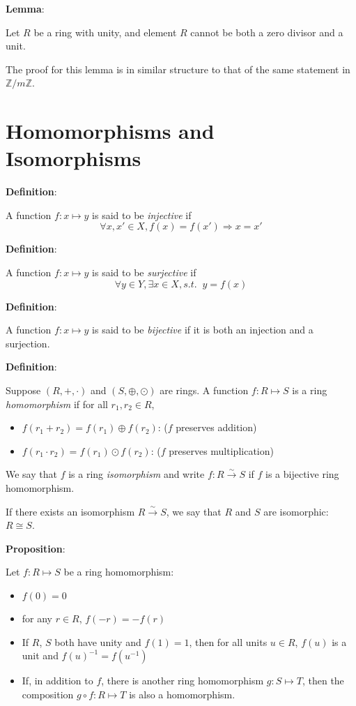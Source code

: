 \documentclass{article}
\begin{document}
\begin{multicols*}{2}
\textbf{Lemma}:

Let $R$ be a ring with unity, and element $R$ cannot be both a zero divisor and a unit.

The proof for this lemma is in similar structure to that of the same statement in $\mathbb{Z}/m\mathbb{Z}$.

\section{Homomorphisms and Isomorphisms}

\textbf{Definition}:

A function $f: x \mapsto y$ is said to be \textit{injective} if \[\forall x,x' \in X,f(x) = f(x') \Rightarrow x = x'\]

\textbf{Definition}:

A function $f: x \mapsto y$ is said to be \textit{surjective} if\[\forall y\in Y,\exists x\in X, s.t. \;\; y = f(x)\]

\textbf{Definition}:

A function $f: x \mapsto y$ is said to be \textit{bijective} if it is both an injection and a surjection.

\textbf{Definition}:

Suppose $(R, +, \cdot)$ and $(S, \oplus, \odot)$ are rings. A function $f: R \mapsto S$ is a ring \textit{homomorphism} if for all $r_1,r_2 \in R$, 

\begin{itemize}
    \item $f(r_1 + r_2) = f(r_1) \oplus f(r_2)$: ($f$ preserves addition)
    \item $f(r_1 \cdot r_2) = f(r_1) \odot f(r_2)$: ($f$ preserves multiplication)
\end{itemize}

We say that $f$ is a ring \textit{isomorphism} and write $f : R \xrightarrow{\sim} S$ if $f$ is a bijective ring homomorphism.

If there exists an isomorphism $R \xrightarrow{\sim} S$, we say that $R$ and $S$ are isomorphic: $R \cong S$.

\textbf{Proposition}:

Let $f : R \mapsto S$ be a ring homomorphism:

\begin{itemize}
    \item $f(0) = 0$
    \item for any $r \in R$, $f(-r) = -f(r)$
    \item If $R$, $S$ both have unity and $f(1) = 1$, then for all units $u \in R$, $f(u)$ is a unit and $f(u)^{-1} = f(u^{-1})$
    \item If, in addition to $f$, there is another ring homomorphism $g: S \mapsto T$, then the composition $g \circ f : R \mapsto T$ is also a homomorphism.
\end{itemize}


\end{multicols*}
\end{document}
